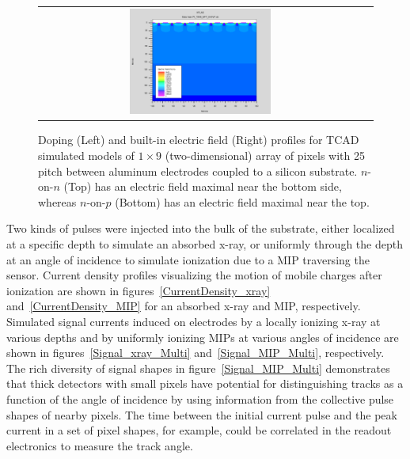 \begin{refsection}
\begin{figure}[htb]
\begin{center}
\begin{tabular}{cc}
      \includegraphics[width=0.45\textwidth]{fig_FastTiming/ElectricField_nonp.png} \\
    \end{tabular}
    \caption{Doping (Left) and built-in electric field (Right) profiles for TCAD simulated models of $1 \times 9$ (two-dimensional) array of pixels with 25 \si{\micron} pitch between aluminum electrodes coupled to a silicon substrate.
            $n$-on-$n$ (Top) has an electric field maximal near the bottom side, whereas $n$-on-$p$ (Bottom) has an electric field maximal near the top.
            }
    \label{Doping_ElectricField}
  \end{center}
\end{figure}

Two kinds of pulses were injected into the bulk of the substrate, either localized at a specific depth to simulate an absorbed x-ray, or uniformly through the depth at an angle of incidence to simulate ionization due to a MIP traversing the sensor.
Current density profiles visualizing the motion of mobile charges after ionization are shown in figures~\ref{CurrentDensity_xray} and~\ref{CurrentDensity_MIP} for an absorbed x-ray and MIP, respectively.
Simulated signal currents induced on electrodes by a locally ionizing x-ray at various depths and by uniformly ionizing MIPs at various angles of incidence are shown in figures~\ref{Signal_xray_Multi} and~\ref{Signal_MIP_Multi}, respectively.
The rich diversity of signal shapes in figure~\ref{Signal_MIP_Multi} demonstrates that thick detectors with small pixels have potential for distinguishing tracks as a function of the angle of incidence by using information from the collective pulse shapes of nearby pixels. 
The time between the initial current pulse and the peak current in a set of pixel shapes, for example, could be correlated in the readout electronics to measure the track angle.


\end{refsection}
